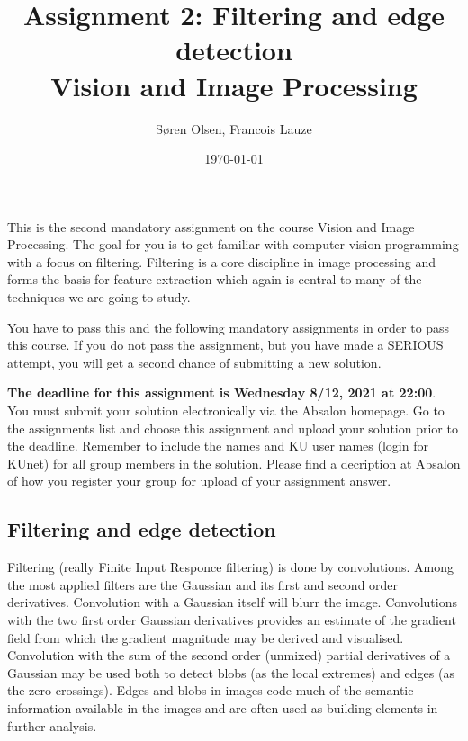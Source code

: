\documentclass[a4paper,12pts]{article}
\begin{document}
\title{Assignment 2: Filtering and edge detection\\
Vision and Image Processing}
\author{Søren Olsen, Francois Lauze}
\date{\today}
\maketitle


\noindent 
This is the second mandatory assignment on the course Vision and Image
Processing. The goal for you is to get familiar  with computer vision
programming with a focus on filtering. Filtering is a core 
discipline in image processing and forms the basis for feature
extraction which again is central to many of the techniques we are
going to study.
\bigskip

You have to pass
this and the following mandatory assignments %
in order to
pass this course.  If you do not pass the assignment, but you have
made a SERIOUS attempt, you will get a second chance of submitting a
new solution.  
\bigskip

{\bf The deadline for this assignment is Wednesday 8/12, 2021 at 22:00}. 
You must submit your solution electronically via the Absalon homepage. Go to
the assignments list and choose this assignment and upload your
solution prior to the deadline.  Remember to include the names and KU
user names (login for {KU}net) for all group members in the solution.
Please find a decription at Absalon of how you register your group for
upload of your assignment answer.


\subsection*{Filtering and edge detection}
Filtering (really Finite Input Responce filtering) is done by
convolutions. Among the most applied filters are the Gaussian and its
first and second order derivatives. Convolution with a Gaussian itself
will blurr the image.  Convolutions with the two first order Gaussian
derivatives provides an estimate of the gradient field from which the
gradient magnitude may be derived and visualised. Convolution with the
sum of the second order (unmixed) partial derivatives of a Gaussian
may be used both to detect blobs (as
the local extremes) and edges (as the zero crossings). Edges and
blobs in images code much of the semantic information available in
the images and are often used as building elements in further analysis.
\medskip
\end{document}
